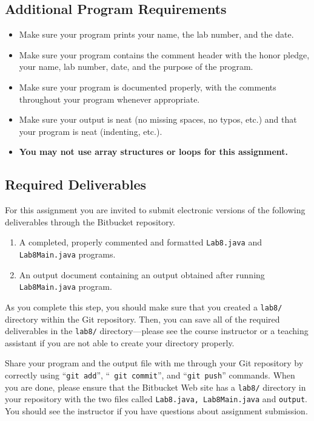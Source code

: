 \vspace{-0.05in}
\subsection*{Additional Program Requirements}
\vspace{-0.05in}
\begin{itemize}
\item Make sure your program prints your name, the lab number, and the date. 
\item Make sure your program contains the comment header with the honor pledge, your name, lab number, date, and the purpose of the program. 
\item Make sure your program is documented properly, with the comments throughout your program whenever appropriate. 
\item Make sure your output
is neat (no missing spaces, no typos, etc.) and that your program is neat (indenting, etc.).
\item \textbf{You may not use array structures or loops for this assignment.}
\end{itemize}

\vspace{-0.05in}
\subsection*{Required Deliverables}
\vspace{-0.05in}
For this assignment you are invited to submit electronic versions of the following deliverables through the Bitbucket repository. 
\begin{enumerate}
		\item A completed, properly commented and formatted {\tt Lab8.java} and {\tt Lab8Main.java} programs.

        \item An output document containing an output obtained after running {\tt Lab8Main.java} program.
        
\end{enumerate}

\noindent As you complete this step, you should make sure that you
created a {\tt lab8/} directory within the Git repository.  Then, you can save all of the required deliverables in the
{\tt lab8/} directory---please see the course instructor or a teaching assistant if you are not able to create your
directory properly. 

\noindent Share your program and the output file with me through your Git repository by correctly using ``{\tt git add}'', ``{\tt
git commit}'', and ``{\tt git push}'' commands. When you are done, please ensure that the Bitbucket Web site has
a {\tt lab8/} directory in your repository with the two files called {\tt Lab8.java, Lab8Main.java} and {\tt output}. You should see 
the instructor if you have questions about assignment submission.





